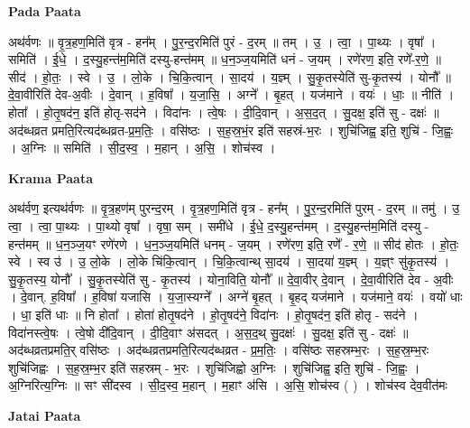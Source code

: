 \documentclass[17pt]{extarticle}
\begin{document}
\textbf{Pada Paata} \newline

अथ॑र्वणः ॥ वृ॒त्र॒हण॒मिति॑ वृत्र - हन᳚म् । पु॒र॒न्द॒रमिति॑ पुरं - द॒रम् ॥ तम् । उ॒ । त्वा॒ । पा॒थ्यः । वृषा᳚ । समिति॑ । ई॒धे॒ । द॒स्यु॒हन्त॑म॒मिति॑ दस्यु-हन्त॑मम् ॥ ध॒न॒ञ्ज॒यमिति॑ धनं - ज॒यम् । रणे॑रण॒ इति॒ रणे᳚-र॒णे॒ ॥ सीद॑ । हो॒तः॒ । स्वे । उ॒ । लो॒के । चि॒कि॒त्वान् । सा॒दय॑ । य॒ज्ञ्म् । सु॒कृ॒तस्येति॑ सु-कृ॒तस्य॑ । योनौ᳚ ॥ दे॒वा॒वीरिति॑ देव-अ॒वीः । दे॒वान् । ह॒विषा᳚ । य॒जा॒सि॒ । अग्ने᳚ । बृ॒हत् । यज॑माने । वयः॑ । धाः॒ ॥ नीति॑ । होता᳚ । हो॒तृ॒षद॑न॒ इति॑ होतृ-सद॑ने । विदा॑नः । त्वे॒षः । दी॒दि॒वान् । अ॒स॒द॒त् । सु॒दक्ष॒ इति॑ सु - दक्षः॑ ॥ अद॑ब्धव्रत प्रमति॒रित्यद॑ब्धव्रत-प्र॒म॒तिः॒ । वसि॑ष्ठः । स॒ह॒स्र॒भं॒र इति॑ सहस्रं-भ॒रः । शुचि॑जिह्व॒ इति॒ शुचि॑ - जि॒ह्वः॒ । अ॒ग्निः ॥ समिति॑ । सी॒द॒स्व॒ । म॒हान् । अ॒सि॒ । शोच॑स्व ।  \newline


\textbf{Krama Paata} \newline

अथ॑र्वण॒ इत्यथ॑र्वणः ॥ वृ॒त्र॒हण॑म् पुरन्द॒रम् । वृ॒त्र॒हण॒मिति॑ वृत्र - हन᳚म् । पु॒र॒न्द॒रमिति॑ पुरम् - द॒रम् ॥ तमु॑ । उ॒ त्वा॒ । त्वा॒ पा॒थ्यः । पा॒थ्यो वृषा᳚ । वृषा॒ सम् । समी॑धे । ई॒धे॒ द॒स्यु॒हन्त॑मम् । द॒स्यु॒हन्त॑म॒मिति॑ दस्यु - हन्त॑मम् ॥ ध॒न॒ञ्ज॒यꣳ रणे॑रणे । ध॒न॒ञ्ज॒यमिति॑ धनम् - ज॒यम् । रणे॑रण॒ इति॒ रणे᳚ - र॒णे॒ ॥ सीद॑ होतः । हो॒तः॒ स्वे । स्व उ॑ । उ॒ लो॒के । लो॒के चि॑कि॒त्वान् । चि॒कि॒त्वान्थ् सा॒दय॑ । सा॒दया॑ य॒ज्ञ्म् । य॒ज्ञ्ꣳ सु॑कृ॒तस्य॑ । सु॒कृ॒तस्य॒ योनौ᳚ । सु॒कृ॒तस्येति॑ सु - कृ॒तस्य॑ । योना॒विति॒ योनौ᳚ ॥ दे॒वा॒वीर् दे॒वान् । दे॒वा॒वीरिति॑ देव - अ॒वीः । दे॒वान्. ह॒विषा᳚ । ह॒विषा॑ यजासि । य॒जा॒स्यग्ने᳚ । अग्ने॑ बृ॒हत् । बृ॒हद् यज॑माने । यज॑माने॒ वयः॑ । वयो॑ धाः । धा॒ इति॑ धाः ॥ नि होता᳚ । होता॑ होतृ॒षद॑ने । हो॒तृ॒षद॑ने॒ विदा॑नः । हो॒तृ॒षद॑न॒ इति॑ होतृ - सद॑ने । विदा॑नस्त्वे॒षः । त्वे॒षो दी॑दि॒वान् । दी॒दि॒वाꣳ अ॑सदत् । अ॒स॒द॒थ् सु॒दक्षः॑ । 
सु॒दक्ष॒ इति॑ सु - दक्षः॑ ॥ अद॑ब्धव्रतप्रमति॒र् वसि॑ष्ठः । अद॑ब्धव्रतप्रमति॒रित्यद॑ब्धव्रत - प्र॒म॒तिः॒ । वसि॑ष्ठः सहस्रम्भ॒रः । स॒ह॒स्र॒म्भ॒रः शुचि॑जिह्वः । स॒ह॒स्र॒म्भ॒र इति॑ सहस्रम् - भ॒रः । शुचि॑जिह्वो अ॒ग्निः । शुचि॑जिह्व॒ इति॒ शुचि॑ - जि॒ह्वः॒ । अ॒ग्निरित्य॒ग्निः ॥ सꣳ सी॑दस्व । सी॒द॒स्व॒ म॒हान् । म॒हाꣳ अ॑सि । अ॒सि॒ शोच॑स्व ( ) । शोच॑स्व देव॒वीत॑मः \newline

\textbf{Jatai Paata} \newline
\end{document}
